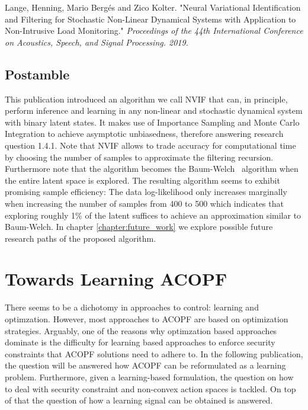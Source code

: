 \documentclass[11pt]{cmuthesis} %
\begin{document}
Lange, Henning, Mario Bergés and Zico Kolter. "Neural Variational Identification and Filtering for Stochastic Non-Linear Dynamical Systems with Application to Non-Intrusive Load Monitoring." \emph{Proceedings of the 44th International Conference on Acoustics, Speech, and Signal Processing. 2019.}



\section{Postamble}
This publication introduced an algorithm we call NVIF that can, in principle, perform inference and learning in any non-linear and stochastic dynamical system with binary latent states. It makes use of Importance Sampling and Monte Carlo Integration to achieve asymptotic unbiasedness, therefore answering research question 1.4.1. Note that NVIF allows to trade accuracy for computational time by choosing the number of samples to approximate the filtering recursion. Furthermore note that the algorithm becomes the Baum-Welch~\cite{baum1970maximization} algorithm when the entire latent space is explored. The resulting algorithm seems to exhibit promising sample efficiency: The data log-likelihood only increases marginally when increasing the number of samples from 400 to 500 which indicates that exploring roughly 1\% of the latent suffices to achieve an approximation similar to Baum-Welch. In chapter \ref{chapter:future_work} we explore possible future research paths of the proposed algorithm.


\newpage
\chapter{Towards Learning ACOPF}
There seems to be a dichotomy in approaches to control: learning and optimzation. However, most approaches to ACOPF are based on optimization strategies. Arguably, one of the reasons why optimzation based approaches dominate is the difficulty for learning based approaches to enforce security constraints that ACOPF solutions need to adhere to. In the following publication, the question will be answered how ACOPF can be reformulated as a learning problem. Furthermore, given a learning-based formulation, the question on how to deal with security constraint and non-convex action spaces is tackled. On top of that the question of how a learning signal can be obtained is answered. 
\label{chapter:lopf}

\end{document}
